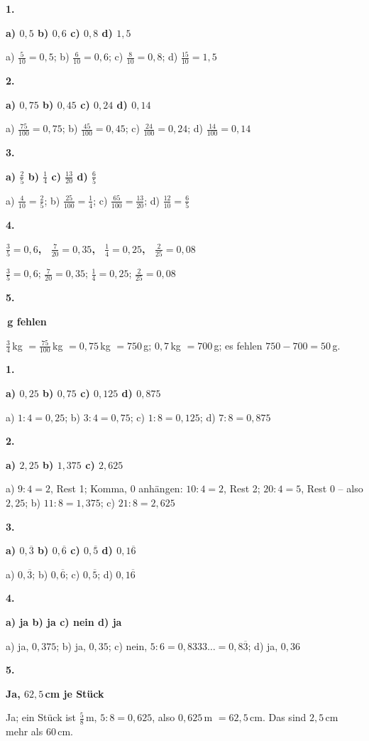 \documentclass[11pt]{article}
\newcommand{\lsg}[3]{\par\noindent\begin{minipage}[t]{9mm}\textbf{#1}\end{minipage}%
  \begin{minipage}[t]{52mm}\raggedright\bfseries\boldmath #2\end{minipage}\hspace{3mm}%
  \begin{minipage}[t]{\dimexpr\linewidth-64mm\relax}\raggedright\small #3\end{minipage}\par\vspace{4pt}}
\begin{document}
\par\Needspace{25mm}\vspace{6pt}\noindent\colorbox{black!12}{}\hspace{2mm}{\bfseries Bruch und Dezimalzahl: erweitern und kürzen}\par\vspace{4pt}
\lsg{1.}{a) $0{,}5$ \quad b) $0{,}6$ \quad c) $0{,}8$ \quad d) $1{,}5$}{a) $\frac{5}{10} = 0{,}5$; b) $\frac{6}{10} = 0{,}6$; c) $\frac{8}{10} = 0{,}8$; d) $\frac{15}{10} = 1{,}5$}
\lsg{2.}{a) $0{,}75$ \quad b) $0{,}45$ \quad c) $0{,}24$ \quad d) $0{,}14$}{a) $\frac{75}{100} = 0{,}75$; b) $\frac{45}{100} = 0{,}45$; c) $\frac{24}{100} = 0{,}24$; d) $\frac{14}{100} = 0{,}14$}
\lsg{3.}{a) $\frac{2}{5}$ \quad b) $\frac{1}{4}$ \quad c) $\frac{13}{20}$ \quad d) $\frac{6}{5}$}{a) $\frac{4}{10} = \frac{2}{5}$; b) $\frac{25}{100} = \frac{1}{4}$; c) $\frac{65}{100} = \frac{13}{20}$; d) $\frac{12}{10} = \frac{6}{5}$}
\lsg{4.}{$\frac{3}{5} = 0{,}6$, \ $\frac{7}{20} = 0{,}35$, \ $\frac{1}{4} = 0{,}25$, \ $\frac{2}{25} = 0{,}08$}{$\frac{3}{5} = 0{,}6$; $\frac{7}{20} = 0{,}35$; $\frac{1}{4} = 0{,}25$; $\frac{2}{25} = 0{,}08$}
\lsg{5.}{50\,g fehlen}{$\frac{3}{4}$\,kg $= \frac{75}{100}$\,kg $= 0{,}75$\,kg $= 750$\,g; $0{,}7$\,kg $= 700$\,g; es fehlen $750 - 700 = 50$\,g.}
\par\Needspace{25mm}\vspace{6pt}\noindent\colorbox{black!12}{}\hspace{2mm}{\bfseries Teilen: Zähler durch Nenner, auch periodisch}\par\vspace{4pt}
\lsg{1.}{a) $0{,}25$ \quad b) $0{,}75$ \quad c) $0{,}125$ \quad d) $0{,}875$}{a) $1 : 4 = 0{,}25$; b) $3 : 4 = 0{,}75$; c) $1 : 8 = 0{,}125$; d) $7 : 8 = 0{,}875$}
\lsg{2.}{a) $2{,}25$ \quad b) $1{,}375$ \quad c) $2{,}625$}{a) $9 : 4 = 2$, Rest 1; Komma, 0 anhängen: $10 : 4 = 2$, Rest 2; $20 : 4 = 5$, Rest 0 – also $2{,}25$; b) $11 : 8 = 1{,}375$; c) $21 : 8 = 2{,}625$}
\lsg{3.}{a) $0{,}\overline{3}$ \quad b) $0{,}\overline{6}$ \quad c) $0{,}\overline{5}$ \quad d) $0{,}1\overline{6}$}{a) $0{,}\overline{3}$; b) $0{,}\overline{6}$; c) $0{,}\overline{5}$; d) $0{,}1\overline{6}$}
\lsg{4.}{a) ja \quad b) ja \quad c) nein \quad d) ja}{a) ja, $0{,}375$; b) ja, $0{,}35$; c) nein, $5 : 6 = 0{,}8333\ldots = 0{,}8\overline{3}$; d) ja, $0{,}36$}
\lsg{5.}{Ja, $62{,}5$\,cm je Stück}{Ja; ein Stück ist $\frac{5}{8}$\,m, $5 : 8 = 0{,}625$, also $0{,}625$\,m $= 62{,}5$\,cm. Das sind $2{,}5$\,cm mehr als 60\,cm.}
\end{document}
